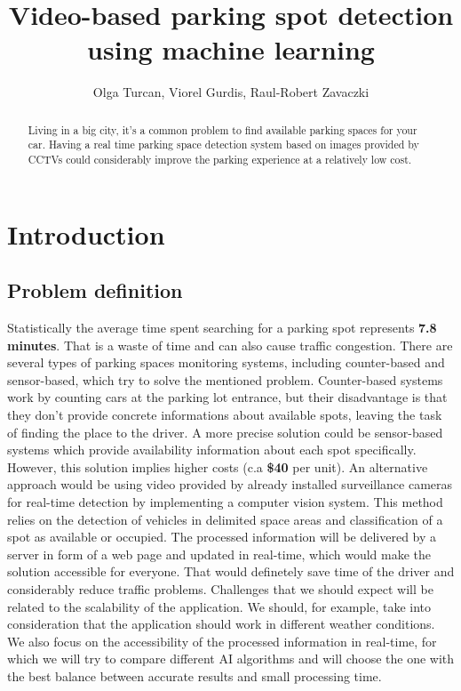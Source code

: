 \documentclass[12pt]{article}
\title{Video-based parking spot detection using machine learning}
\author{Olga Turcan, Viorel Gurdis, Raul-Robert Zavaczki}
\begin{document}
 

\maketitle
\begin{abstract}
  Living in a big city, it's a common problem to find available parking 
  spaces for your car. Having a real time parking space 
  detection system based on images provided by CCTVs could considerably 
  improve the parking experience at a relatively low cost.
\end{abstract}

\section{Introduction}

\subsection{Problem definition}

Statistically the average time spent searching for a parking spot represents \textbf{7.8 minutes}.
That is a waste of time and can also cause traffic congestion. There are several types of 
parking spaces monitoring systems, including counter-based and sensor-based, which try to solve the mentioned problem.
Counter-based systems work by counting cars at the parking lot entrance, but their disadvantage is that they don't provide 
concrete informations about available spots, leaving the task of finding the place to the driver.
A more precise solution could be sensor-based systems which provide availability information about each 
spot specifically. However, this solution implies higher costs (c.a \textbf{\$40} per unit). 
An alternative approach would be using video provided by already installed surveillance cameras for real-time 
detection by implementing a computer vision system.
This method relies on the detection of vehicles in delimited space areas and classification of a spot as 
available or occupied. The processed information will be delivered by a server in form of a web page and updated 
in real-time, which would make the solution accessible for everyone. That would definetely save time of the driver 
and considerably reduce traffic problems.
Challenges that we should expect will be related to the scalability of the application. We should, for example, take into 
consideration that the application should work in different weather conditions. We also focus on the accessibility 
of the processed information in real-time, for which we will try to compare different AI algorithms and will choose 
the one with the best balance between accurate results and small processing time.
\end{document}
